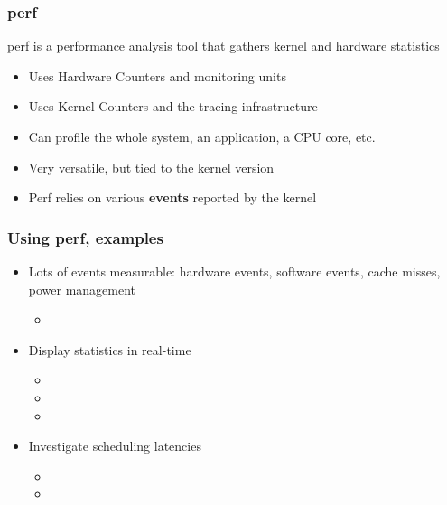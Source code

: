 \begin{frame}
        \frametitle{perf}
        perf is a performance analysis tool that gathers kernel and hardware statistics
        \begin{itemize}
                \item Uses Hardware Counters and monitoring units
                \item Uses Kernel Counters and the tracing infrastructure
                \item Can profile the whole system, an application, a CPU core, etc.
                \item Very versatile, but tied to the kernel version
                \item Perf relies on various \textbf{events} reported by the kernel
        \end{itemize}
\end{frame}

\begin{frame}
        \frametitle{Using perf, examples}
        \begin{itemize}
                \item Lots of events measurable: hardware events, software events, cache misses, power management
                        \begin{itemize}
                                \item {}
                        \end{itemize}
                \item Display statistics in real-time
                        \begin{itemize}
                                \item {}
                                \item {}
                                \item {}
                        \end{itemize}
                \item Investigate scheduling latencies
                        \begin{itemize}
                                \item {}
                                \item {}
                        \end{itemize}
        \end{itemize}
\end{frame}

